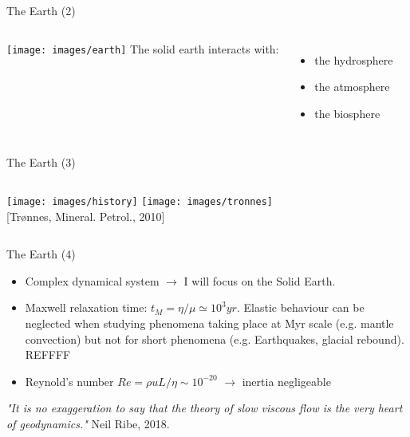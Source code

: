 \documentclass[handout]{beamer}
\begin{document}
\begin{frame}[plain]{The Earth (2)}
\begin{columns}[onlytextwidth]
\texttt{[image: images/earth]}
The solid earth interacts with:
\begin{itemize}
\item the hydrosphere
\item the atmosphere
\item the biosphere
\end{itemize}
\end{columns}
\end{frame}

\begin{frame}[plain]{The Earth (3)}
\begin{columns}[onlytextwidth]
\texttt{[image: images/history]}
\texttt{[image: images/tronnes]}\\
{\tiny [Trønnes, Mineral. Petrol., 2010]}
\end{columns}
\end{frame}

\begin{frame}[plain]{The Earth (4)}

\begin{itemize}
\item Complex dynamical system $\rightarrow$ I will focus on the Solid Earth.
\pause
\item Maxwell relaxation time: $t_M = \eta/\mu \simeq 10^3yr$.
Elastic behaviour can be neglected when studying phenomena taking place at Myr scale 
(e.g. mantle convection) but not for short phenomena (e.g. Earthquakes, glacial rebound).  REFFFF
\pause
\item Reynold's number $Re=\rho u L/\eta \sim 10^{-20}$ $\rightarrow$ inertia negligeable
\end{itemize}

\vspace{.3cm} 
\pause

{\it "It is no exaggeration to say that the theory of slow viscous flow is the very heart of geodynamics."}
Neil Ribe, 2018.

\end{frame}
\end{document}
